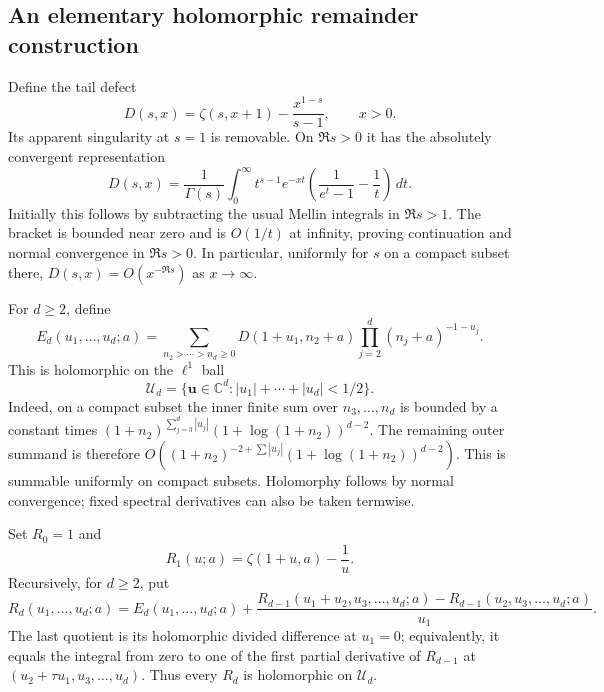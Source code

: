 \documentclass[11pt,letterpaper]{article}
\numberwithin{equation}{section}
\theoremstyle{definition}
\theoremstyle{remark}
\begin{document}
\subsection{An elementary holomorphic remainder construction}

Define the tail defect
\begin{equation}\label{ord:taildefect}
 D(s,x)=\zeta(s,x+1)-\frac{x^{1-s}}{s-1},\qquad x>0.
\end{equation}
Its apparent singularity at $s=1$ is removable. On $\Re s>0$ it has
the absolutely convergent representation
\begin{equation}\label{ord:tailmellin}
 D(s,x)=\frac1{\Gamma(s)}\int_0^\infty
 t^{s-1}e^{-xt}\left(\frac1{e^t-1}-\frac1t\right)\,dt.
\end{equation}
Initially this follows by subtracting the usual Mellin integrals in
$\Re s>1$. The bracket is bounded near zero and is $O(1/t)$ at
infinity, proving continuation and normal convergence in $\Re s>0$.
In particular, uniformly for $s$ on a compact subset there,
$D(s,x)=O(x^{-\Re s})$ as $x\to\infty$.

For $d\ge2$, define
\begin{equation}\label{ord:Edef}
 E_d(u_1,\ldots,u_d;a)
 =\sum_{n_2>\cdots>n_d\ge0}
 D(1+u_1,n_2+a)\prod_{j=2}^d(n_j+a)^{-1-u_j}.
\end{equation}
This is holomorphic on the $\ell^1$ ball
\[
 \mathcal U_d=\{\mathbf u\in\mathbb C^d:
                         |u_1|+\cdots+|u_d|<1/2\}.
\]
Indeed, on a compact subset the inner finite sum over $n_3,\ldots,n_d$
is bounded by a constant times
$(1+n_2)^{\sum_{j=3}^d|u_j|}(1+\log(1+n_2))^{d-2}$.
The remaining outer summand is therefore
$O((1+n_2)^{-2+\sum|u_j|}(1+\log(1+n_2))^{d-2})$.
This is summable uniformly on compact subsets. Holomorphy follows by
normal convergence; fixed spectral derivatives can also be taken termwise.

Set $R_0=1$ and
\[
 R_1(u;a)=\zeta(1+u,a)-\frac1u.
\]
Recursively, for $d\ge2$, put
\begin{equation}\label{ord:Rrecursion}
 R_d(u_1,\ldots,u_d;a)=E_d(u_1,\ldots,u_d;a)
 +\frac{R_{d-1}(u_1+u_2,u_3,\ldots,u_d;a)
             -R_{d-1}(u_2,u_3,\ldots,u_d;a)}{u_1}.
\end{equation}
The last quotient is its holomorphic divided difference at $u_1=0$;
equivalently, it equals the integral from zero to one of the first
partial derivative of $R_{d-1}$ at
$(u_2+\tau u_1,u_3,\ldots,u_d)$. Thus every $R_d$ is holomorphic on
$\mathcal U_d$.
\end{document}
